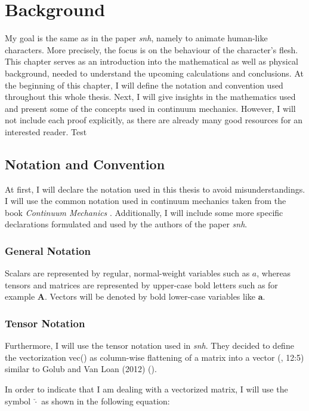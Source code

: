 \chapter{Background} \label{c:Background}
My goal is the same as in the paper \textit{\acrshort{snh}}, namely to animate human-like characters. More precisely, the focus is on the behaviour of the character's flesh. This chapter serves as an introduction into the mathematical as well as physical background, needed to understand the upcoming calculations and conclusions. At the beginning of this chapter, I will define the notation and convention used throughout this whole thesis. Next, I will give insights in the mathematics used and present some of the concepts used in continuum mechanics. However, I will not include each proof explicitly, as there are already many good resources for an interested reader. Test

\section{Notation and Convention}
At first, I will declare the notation used in this thesis to avoid misunderstandings. I will use the common notation used in continuum mechanics taken from the book \textit{Continuum Mechanics} \cite{Spencer1980}. Additionally, I will include some more specific declarations formulated and used by the authors of the paper \textit{\acrshort{snh}}.


\subsection{General Notation}
Scalars are represented by regular, normal-weight variables such as $a$, whereas tensors and matrices are represented by upper-case bold letters such as for example $\textbf{A}$. Vectors will be denoted by bold lower-case variables like $\textbf{a}$. 


\subsection{Tensor Notation}
Furthermore, I will use the tensor notation used in \textit{\acrshort{snh}}. They decided to define the vectorization vec(\cdot) as column-wise flattening of a matrix into a vector (\cite{Smith:2018:SNF:3191713.3180491}, 12:5) similar to Golub and Van Loan (2012) (\cite{golub2012matrix}).

In order to indicate that I am dealing with a vectorized matrix, I will use the symbol $\check{\cdot}$ as shown in the following equation:

